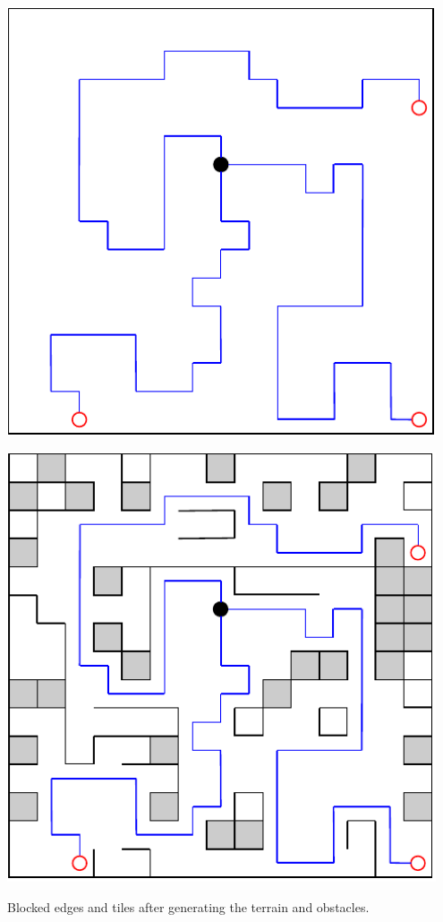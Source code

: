 \begin{center}
    \captionsetup{type=figure}
    \begin{minipage}{.5\textwidth}
        \centering
        \includegraphics[width=0.95\textwidth]{img/Generated Paths.pdf}
    \end{minipage}%
    \begin{minipage}{.5\textwidth}
        \centering
        \includegraphics[width=0.95\textwidth]{img/Paths and world.pdf}
    \end{minipage}
    \caption{Blocked edges and tiles after generating the terrain and obstacles.}
    \label{fig:paths-world}
\end{center}


